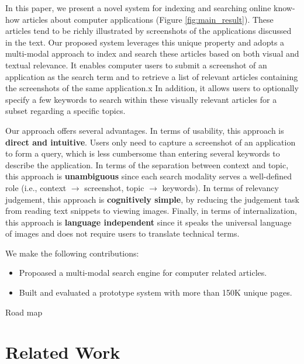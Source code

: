 \documentclass{www2010-submission}
\begin{document}
In this paper, we present a novel system for indexing and searching
online know-how articles about computer applications (Figure
\ref{fig:main_result}).  These articles tend to be richly illustrated
by screenshots of the applications discussed in the text. Our proposed
system leverages this unique property and adopts a multi-modal
approach to index and search these articles based on both visual and
textual relevance.  It enables computer users to submit a screenshot
of an application as the search term and to retrieve a list of
relevant articles containing the screenshots of the same
application.x In addition, it allows users to optionally specify a few
keywords to search within these visually relevant articles for a
subset regarding a specific topics.

Our approach offers several advantages. In terms of usability, this
approach is \textbf{direct and intuitive}. Users only need to capture a
screenshot of an application to form a query, which is less cumbersome
than entering several keywords to describe the application. In terms
of the separation between context and topic, this approach is
\textbf{unambiguous} since each search modality serves a well-defined
role (i.e., context $\rightarrow$ screenshot, topic
$\rightarrow$ keywords). In terms of relevancy judgement, this approach 
is \textbf{cognitively simple}, by reducing the judgement task from
reading text snippets to viewing images.  Finally, in terms of
internalization, this approach is \textbf{language independent} since
it speaks the universal language of images and does not require
users to translate technical terms.

We make the following contributions:
\begin{itemize}
\item Propoased a multi-modal search engine for computer related articles.
\item Built and evaluated a prototype system with more than 150K unique
pages.

\end{itemize}

Road map

\section{Related Work}
\end{document}
